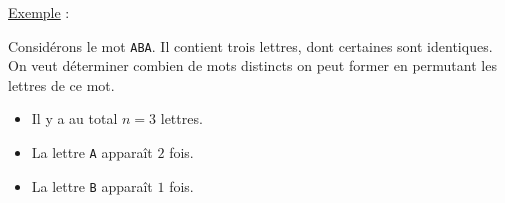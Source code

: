\documentclass[12pt]{article}
\newif\ifcorrection
\newcommand{\corr}[1]{\ifcorrection{\color{lightblue}#1\color{black}}\fi}
\newcommand{\petitespace}{\vspace{0.5cm}}
\newcommand{\somme}[2]{\sum\limits_{#1}^{#2}}
\newcommand{\1}{\bb{1}} %
\begin{document}
\corr{\textbf{Preuve :}

Considérons qu'il y a $k$ positions distinctes à remplir dans le  $k$-uplet. Chaque position contiendra un élément de $E$, et l'élément $x_i$ doit apparaître exactement $k_i$ fois.

Pour le premier élément $x_1$, on doit choisir $k_1$ positions parmi les $k$ restantes. Il s'agit donc d'une combinaison car l'ordre ne compte pas, de $k_1$ parmi $k$ (voir combinaison en $\boldsymbol{4.4}$). Ainsi, on a :

$$C_k^{k_1} = \begin{pmatrix} k \\k_1 \end{pmatrix}=\frac{k!}{k_1!(k-k_1)!} $$

Après cette étape, pour placer $x_2$, on doit choisir $k_2$ parmi $k-k_1$ positions donc $C_{k-k_1}^{k_2}$. On généralise donc à $k_i, i \in \ldbrack 1, n\rdbrack$, et on obtient que pour placer $x_i$ on a donc 

$$C_{k-\somme{j=1}{i-1} k_j}^{k_i} = \begin{pmatrix} k-\somme{j=1}{i-1} k_j \\k_i \end{pmatrix}= \frac{(k-\somme{j=1}{i-1} k_j)!}{k_i!(k-\somme{j=1}{i} k_j)!} \quad \text{possibilités}$$

Pour le dernier éléments, toutes les places sont prises donc il n'y a qu'une seule façon de les arranger.

Ainsi, on a un nombre total de possibilités est le produit des choix pour chaque étape, car les étapes sont séquentielles et indépendantes (le choix des positions pour un élément n'affecte pas les choix ultérieurs, si l'ordre des éléments est fixé). On a donc un nombre de possibilités égales à :

$$\frac{k!}{k_1!(k-k_1)!} \times \frac{(k-k_1)!}{k_2!(k-k_1)!} \times \ldots \times \frac{(k-k_1- \ldots-k_{n-1})!}{k_n!(0)!}  = \frac{k!}{k_1! k_2!\ldots k_n!} $$
\petitespace}

\underline{Exemple} :\petitespace

Considérons le mot \texttt{ABA}. Il contient trois lettres, dont certaines sont identiques. On veut déterminer combien de mots distincts on peut former en permutant les lettres de ce mot.

\begin{itemize}
    \item Il y a au total $n = 3$ lettres.
    \item La lettre \texttt{A} apparaît $2$ fois.
    \item La lettre \texttt{B} apparaît $1$ fois.
\end{itemize}
\end{document}
